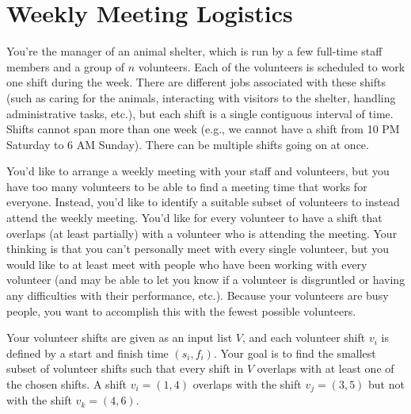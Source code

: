 \section{Weekly Meeting Logistics}

You're the manager of an animal shelter, which is run by a few full-time staff members and a group of $n$ volunteers. Each of the volunteers is scheduled to work one shift during the week. There are different jobs associated with these shifts (such as caring for the animals, interacting with visitors to the shelter, handling administrative tasks, etc.), but each shift is a single contiguous interval of time. Shifts cannot span more than one week (e.g., we cannot have a shift from 10 PM Saturday to 6 AM Sunday). There can be multiple shifts going on at once.

You'd like to arrange a weekly meeting with your staff and volunteers, but you have too many volunteers to be able to find a meeting time that works for everyone. Instead, you'd like to identify a suitable subset of volunteers to instead attend the weekly meeting. You'd like for every volunteer to have a shift that overlaps (at least partially) with a volunteer who is attending the meeting. Your thinking is that you can't personally meet with every single volunteer, but you would like to at least meet with people who have been working with every volunteer (and may be able to let you know if a volunteer is disgruntled or having any difficulties with their performance, etc.). Because your volunteers are busy people, you want to accomplish this with the fewest possible volunteers.

Your volunteer shifts are given as an input list $V$, and each volunteer shift $v_i$ is defined by a start and finish time $(s_i, f_i)$. Your goal is to find  the smallest subset of volunteer shifts such that every shift in $V$ overlaps with at least one of the chosen shifts. A shift $v_i=(1,4)$ overlaps with the shift $v_j=(3,5)$ but not with the shift $v_k=(4,6)$. 

